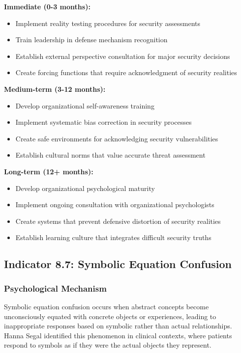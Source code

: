 \documentclass[11pt,a4paper]{article}
\begin{document}
\textbf{Immediate (0-3 months):}
\begin{itemize}
\item Implement reality testing procedures for security assessments
\item Train leadership in defense mechanism recognition
\item Establish external perspective consultation for major security decisions
\item Create forcing functions that require acknowledgment of security realities
\end{itemize}

\textbf{Medium-term (3-12 months):}
\begin{itemize}
\item Develop organizational self-awareness training
\item Implement systematic bias correction in security processes
\item Create safe environments for acknowledging security vulnerabilities
\item Establish cultural norms that value accurate threat assessment
\end{itemize}

\textbf{Long-term (12+ months):}
\begin{itemize}
\item Develop organizational psychological maturity
\item Implement ongoing consultation with organizational psychologists
\item Create systems that prevent defensive distortion of security realities
\item Establish learning culture that integrates difficult security truths
\end{itemize}

\subsection{Indicator 8.7: Symbolic Equation Confusion}

\subsubsection{Psychological Mechanism}

Symbolic equation confusion occurs when abstract concepts become unconsciously equated with concrete objects or experiences, leading to inappropriate responses based on symbolic rather than actual relationships. Hanna Segal identified this phenomenon in clinical contexts, where patients respond to symbols as if they were the actual objects they represent\cite{segal1957}.
\end{document}
